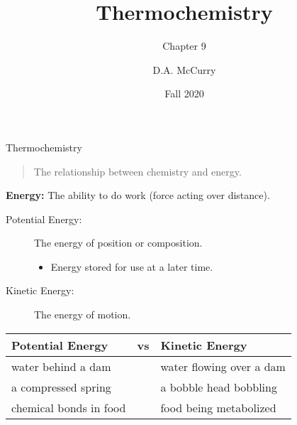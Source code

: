 \documentclass[11pt,letterpaper]{article}
\title{Thermochemistry}
\subtitle{Chapter 9}
\institute[CHEM115 Bloomsburg University]{CHEM115 --- Chemistry for the Sciences I \\ Bloomsburg University}
\author{D.A. McCurry}
\date{Fall 2020}
\begin{document}

\maketitle
{}


\begin{frame}{Thermochemistry}
	\begin{quote}
		The relationship between chemistry and energy.
	\end{quote}
	\textbf{Energy:} The ability to do \alert{work} (force acting over distance).
	\begin{description}
		\item[Potential Energy:] The energy of
			position or composition.
			\begin{itemize}
				\item Energy stored for use at a
					later time.
			\end{itemize}
		\item[Kinetic Energy:] The energy of
			motion.
	\end{description}

	\begin{center}
		\begin{tabularx}{\linewidth} {>{\centering\arraybackslash}X
			c >{\centering\arraybackslash}X}
			\toprule
			\bfseries Potential Energy & \bfseries vs & \bfseries Kinetic Energy \\
			\midrule
			water behind a dam && water flowing over a dam \\
			a compressed spring && a bobble head bobbling \\
			chemical bonds in food && food being metabolized \\
			\bottomrule
		\end{tabularx}
	\end{center}
\end{frame}
\end{document}
